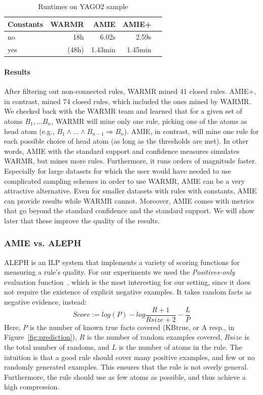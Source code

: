 \begin{table}
\begin{tabular}{l|rr rr|}
Constants 	& WARMR 		& AMIE 		& AMIE+\\
\hline
 no 		& 18h 			& 6.02s 	& 2.59s \\
 yes 		& (48h) 	 	& 1.43min  	& 1.45min\\
\end{tabular}
\caption{Runtimes on YAGO2 sample}
\label{warmrruntime}
\end{table}


\paragraph{Results} After filtering out non-connected rules, WARMR mined 41 closed rules. 
AMIE+, in contrast, mined 74 closed rules, which included the ones mined by WARMR.
We checked back with the WARMR team and learned that for a given set of atoms $B_1, ... B_n$, 
WARMR will mine only one rule,
picking one of the atoms as head atom (e.g., $B_1 \wedge ... \wedge B_{n-1} \Rightarrow B_n$).
AMIE, in contrast, will mine one rule for each possible choice of head atom (as long as the thresholds are met).
In other words, AMIE with the standard support and confidence measures simulates WARMR, but mines more rules.
Furthermore, it runs orders of magnitude faster. 
Especially for large datasets for which the user would have needed to use complicated sampling schemes in order to use WARMR,
AMIE can be a very attractive alternative.
Even for smaller datasets with rules with constants, AMIE can provide results while WARMR cannot.
Moreover, AMIE comes with metrics that go beyond the standard confidence and the standard support.
We will show later that these improve the quality of the results.

\subsubsection{AMIE vs. ALEPH}

ALEPH is an ILP system that implements a variety of scoring functions for measuring a rule's quality. For our experiments we used the 
\emph{Positives-only} evaluation function~\cite{Muggleton:1996:LPD:647996.742465,usir1753}, 
which is the most interesting for our setting, since it does not require the existence of explicit negative examples.
It takes random facts as negative evidence, instead:
\[ Score := log(P)-log\frac{R+1}{Rsize+2}-\frac{L}{P} \]
Here, $P$ is the number of known true facts covered (KBtrue, or A resp., in Figure~\ref{fig:prediction}), $R$ is the number of random examples covered, 
$Rsize$ is the total number of randoms, and $L$ is the number of atoms in the rule. 
The intuition is that a good rule should cover many positive examples, and few or no randomly generated examples. This ensures
that the rule is not overly general. Furthermore, the rule should use as few atoms as possible, and thus achieve a high compression.



